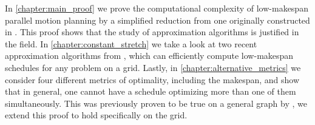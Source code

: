 In \cref{chapter:main_proof} we prove the computational complexity of low-makespan parallel motion planning by a simplified reduction from one originally constructed in \cite{siamcomp/DemaineFKMS19}.
This proof shows that the study of approximation algorithms is justified in the field.
In \cref{chapter:constant_stretch} we take a look at two recent approximation algorithms from \cite{siamcomp/DemaineFKMS19}, which can efficiently compute low-makespan schedules for any problem on a grid.
Lastly, in \cref{chapter:alternative_metrics} we consider four different metrics of optimality, including the makespan, and show that in general, one cannot have a schedule optimizing more than one of them simultaneously.
This was previously proven to be true on a general graph by \cite{corr/YuL15c}, we extend this proof to hold specifically on the grid.
